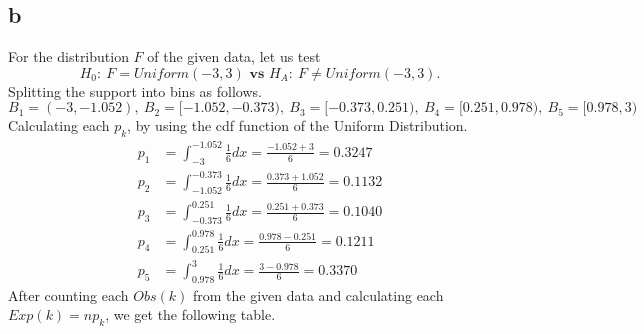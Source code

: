 \documentclass[11pt]{article}
\begin{document}
\subsection*{b}
For the distribution $F$ of the given data, let us test
\begin{equation*}
	H_0: \ F = Uniform(-3, 3) \textbf{ vs } H_A: \ F \neq Uniform(-3, 3).
\end{equation*}
Splitting the support into bins as follows.
\begin{equation}
	B_1 = (-3, -1.052), \ B_2 = [-1.052, -0.373), \ B_3 = [-0.373, 0.251), \ B_4 = [0.251, 0.978), \ B_5 = [0.978, 3)
\end{equation}
Calculating each $p_k$, by using the cdf function of the Uniform Distribution.
\begin{equation}
\begin{split}
	p_1 & = \int_{-3}^{-1.052} \frac{1}{6} dx = \frac{-1.052 + 3}{6} = 0.3247\\
	p_2 & = \int_{-1.052}^{-0.373} \frac{1}{6} dx = \frac{0.373 + 1.052}{6} = 0.1132\\
	p_3 & = \int_{-0.373}^{0.251} \frac{1}{6} dx = \frac{0.251 + 0.373}{6} = 0.1040\\
	p_4 & = \int_{0.251}^{0.978} \frac{1}{6} dx = \frac{0.978 - 0.251}{6} = 0.1211\\
	p_5 & = \int_{0.978}^{3} \frac{1}{6} dx = \frac{3 - 0.978}{6} = 0.3370
	\end{split}
\end{equation}
After counting each $Obs(k)$ from the given data and calculating each $Exp(k) = np_k$, we get the following table.
\end{document}
